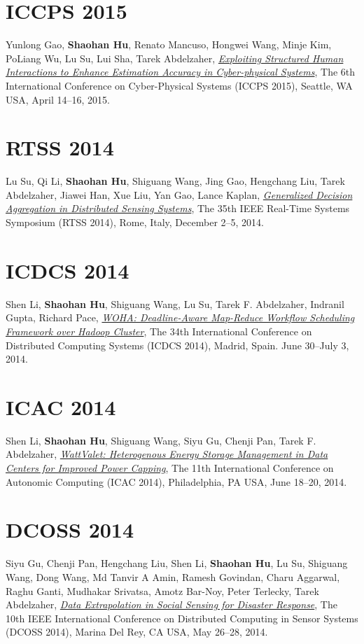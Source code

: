 \section{\sc ICCPS 2015}\hypertarget{gao2015iccps}{} Yunlong Gao, \textbf{Shaohan Hu}, Renato Mancuso, Hongwei Wang, Minje Kim, PoLiang Wu, Lu Su, Lui Sha, Tarek Abdelzaher, \href{http://dl.acm.org/citation.cfm?id=2735960.2735965}{\emph{Exploiting Structured Human Interactions to Enhance Estimation Accuracy in Cyber-physical Systems}}, \textsf{The 6th International Conference on Cyber-Physical Systems (ICCPS 2015)}, Seattle, WA USA, April 14--16, 2015.

\section{\sc RTSS 2014}\hypertarget{su2014rtss}{} Lu Su, Qi Li, \textbf{Shaohan Hu}, Shiguang Wang, Jing Gao, Hengchang Liu, Tarek Abdelzaher, Jiawei Han, Xue Liu, Yan Gao, Lance Kaplan, \href{http://ieeexplore.ieee.org/xpl/articleDetails.jsp?arnumber=7010369}{\emph{Generalized Decision Aggregation in Distributed Sensing Systems}}, \textsf{The 35th IEEE Real-Time Systems Symposium (RTSS 2014)}, Rome, Italy, December 2--5, 2014.

\section{\sc ICDCS 2014}\hypertarget{li2014icdcs}{} Shen Li, \textbf{Shaohan Hu}, Shiguang Wang, Lu Su, Tarek F. Abdelzaher, Indranil Gupta, Richard Pace, \href{http://ieeexplore.ieee.org/xpl/articleDetails.jsp?arnumber=6888886}{\emph{WOHA: Deadline-Aware Map-Reduce Workflow Scheduling Framework over Hadoop Cluster}}, \textsf{The 34th International Conference on Distributed Computing Systems (ICDCS 2014)}, Madrid, Spain. June 30--July 3, 2014.

\section{\sc ICAC 2014}\hypertarget{li2014icac}{} Shen Li, \textbf{Shaohan Hu}, Shiguang Wang, Siyu Gu, Chenji Pan, Tarek F. Abdelzaher, \href{https://www.usenix.org/system/files/conference/icac14/icac14-paper-li_shen.pdf}{\emph{WattValet: Heterogenous Energy Storage Management in Data Centers for Improved Power Capping}}, \textsf{The 11th International Conference on Autonomic Computing (ICAC 2014)}, Philadelphia, PA USA, June 18--20, 2014.

\section{\sc DCOSS 2014}\hypertarget{gu2014dcoss}{} Siyu Gu, Chenji Pan, Hengchang Liu, Shen Li, \textbf{Shaohan Hu}, Lu Su, Shiguang Wang, Dong Wang, Md Tanvir A Amin, Ramesh Govindan, Charu Aggarwal, Raghu Ganti, Mudhakar Srivatsa, Amotz Bar-Noy, Peter Terlecky, Tarek Abdelzaher, \href{http://ieeexplore.ieee.org/xpl/articleDetails.jsp?arnumber=6846153}{\emph{Data Extrapolation in Social Sensing for Disaster Response}}, \textsf{The 10th IEEE International Conference on Distributed Computing in Sensor Systems (DCOSS 2014)}, Marina Del Rey, CA USA, May 26--28, 2014.

